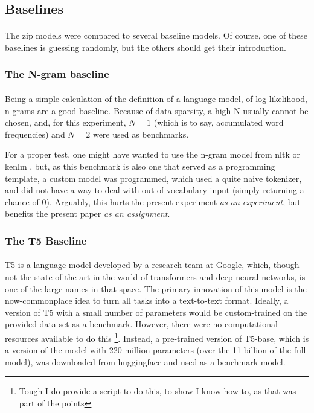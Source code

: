 \documentclass[11pt]{article}
\begin{document}
\subsection{Baselines}

\paragraph{}
The zip models were compared to several baseline models. Of course, one of these baselines is guessing randomly, but the others should get their introduction.

\subsubsection{The N-gram baseline}

\paragraph{}
Being a simple calculation of the definition of a language model, of log-likelihood, n-grams are a good baseline. Because of data sparsity, a high N usually cannot be chosen, and, for this experiment, $N=1$ (which is to say, accumulated word frequencies) and $N=2$ were used as benchmarks.

For a proper test, one might have wanted to use the n-gram model from nltk \parencite{loper2002nltk} or kenlm \parencite{heafield2011kenlm}, but, as this benchmark is also one that served as a programming template, a custom model was programmed, which used a quite naive tokenizer, and did not have a way to deal with out-of-vocabulary input (simply returning a chance of 0). Arguably, this hurts the present experiment \textit{as an experiment}, but benefits the present paper \textit{as an assignment}.

\subsubsection{The T5 Baseline}

\paragraph{}
T5 \parencite{raffel2020exploring} is a language model developed by a research team at Google, which, though not the state of the art in the world of transformers and deep neural networks, is one of the large names in that space. The primary innovation of this model is the now-commonplace idea to turn all tasks into a text-to-text format. Ideally, a version of T5 with a small number of parameters would be custom-trained on the provided data set as a benchmark. However, there were no computational resources available to do this \footnote{Tough I do provide a script to do this, to show I know how to, as that was part of the points}. Instead, a pre-trained version of T5-base, which is a version of the model with 220 million parameters (over the 11 billion of the full model), was downloaded from huggingface and used as a benchmark model.
\end{document}
